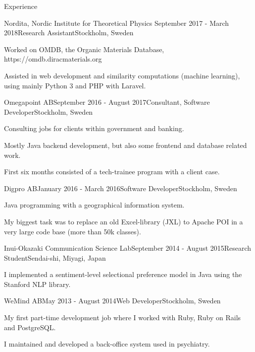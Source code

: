 \documentclass{resume} %
\begin{document}
\begin{rSection}{Experience}

\begin{rSubsection}{Nordita, Nordic Institute for Theoretical Physics} {September 2017 - March 2018}{Research Assistant}{Stockholm, Sweden}
\item Worked on OMDB, the Organic Materials Database, https://omdb.diracmaterials.org
\item Assisted in web development and similarity computations (machine learning),\\using mainly Python 3 and PHP with Laravel.
\end{rSubsection}

\begin{rSubsection}{Omegapoint AB}{September 2016 - August 2017}{Consultant, Software Developer}{Stockholm, Sweden}
\item Consulting jobs for clients within government and banking. 
\item Mostly Java backend development, but also some frontend and database related work.
\item First six months consisted of a tech-trainee program with a client case.
\end{rSubsection}


\begin{rSubsection}{Digpro AB}{January 2016 - March 2016}{Software Developer}{Stockholm, Sweden}
\item Java programming with a geographical information system.
\item My biggest task was to replace an old Excel-library (JXL) to Apache POI in a very large code base (more than 50k classes).
\end{rSubsection}


\begin{rSubsection}{Inui-Okazaki Communication Science Lab}{September 2014 - August 2015}{Research Student}{Sendai-shi, Miyagi, Japan}
\item I implemented a sentiment-level selectional preference model in Java using the Stanford NLP library.
\end{rSubsection}


\begin{rSubsection}{WeMind AB}{May 2013 - August 2014}{Web Developer}{Stockholm, Sweden}
\item My first part-time development job where I worked with Ruby, Ruby on Rails and PostgreSQL.
\item I maintained and developed a back-office system used in psychiatry.
\end{rSubsection}

\end{rSection}
\end{document}
